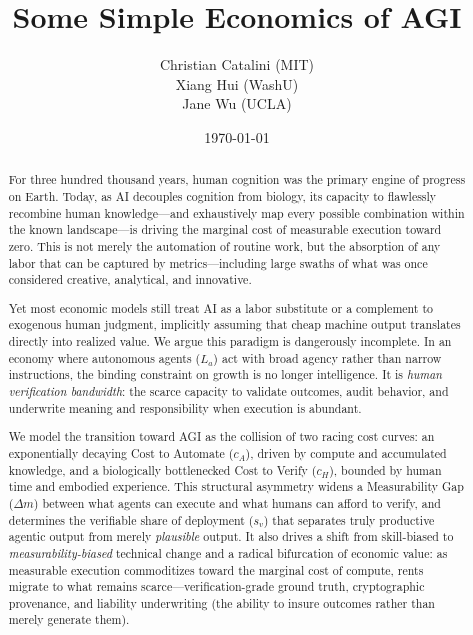 \documentclass[12pt, letter]{article}
\title{Some Simple Economics of AGI}
\author{Christian Catalini (MIT) \\ Xiang Hui (WashU) \\ Jane Wu (UCLA)}
\date{\today}
\begin{document}
\renewcommand{\abstractname}{Extended Abstract}
\maketitle
\thispagestyle{empty}

\begin{abstract}
For three hundred thousand years, human cognition was the primary engine of progress on Earth. Today, as AI decouples cognition from biology, its capacity to flawlessly recombine human knowledge---and exhaustively map every possible combination within the known landscape---is driving the marginal cost of measurable execution toward zero. This is not merely the automation of routine work, but the absorption of any labor that can be captured by metrics---including large swaths of what was once considered creative, analytical, and innovative.

Yet most economic models still treat AI as a labor substitute or a complement to exogenous human judgment, implicitly assuming that cheap machine output translates directly into realized value. We argue this paradigm is dangerously incomplete. In an economy where autonomous agents ($L_a$) act with broad agency rather than narrow instructions, the binding constraint on growth is no longer intelligence. It is \emph{human verification bandwidth}: the scarce capacity to validate outcomes, audit behavior, and underwrite meaning and responsibility when execution is abundant.

We model the transition toward AGI as the collision of two racing cost curves: an exponentially decaying Cost to Automate ($c_A$), driven by compute and accumulated knowledge, and a biologically bottlenecked Cost to Verify ($c_H$), bounded by human time and embodied experience. This structural asymmetry widens a Measurability Gap ($\Delta m$) between what agents can execute and what humans can afford to verify, and determines the verifiable share of deployment ($s_v$) that separates truly productive agentic output from merely \emph{plausible} output. It also drives a shift from skill-biased to \emph{measurability-biased} technical change and a radical bifurcation of economic value: as measurable execution commoditizes toward the marginal cost of compute, rents migrate to what remains scarce---verification-grade ground truth, cryptographic provenance, and liability underwriting (the ability to insure outcomes rather than merely generate them).


\end{abstract}
\end{document}
